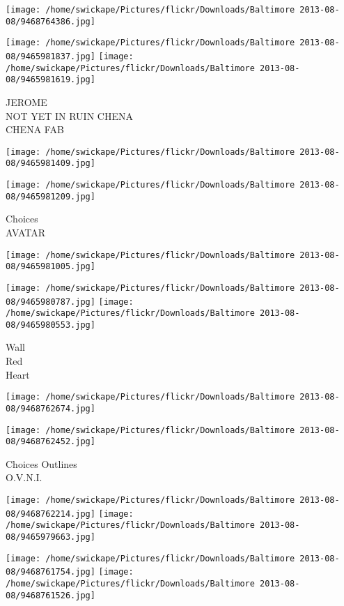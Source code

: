\documentclass[10pt,letterpaper]{article}
\begin{document}
\texttt{[image: /home/swickape/Pictures/flickr/Downloads/Baltimore 2013-08-08/9468764386.jpg]}

\vspace{0.25in}
\texttt{[image: /home/swickape/Pictures/flickr/Downloads/Baltimore 2013-08-08/9465981837.jpg]}
\texttt{[image: /home/swickape/Pictures/flickr/Downloads/Baltimore 2013-08-08/9465981619.jpg]}

JEROME\\
NOT YET IN RUIN CHENA\\
CHENA FAB
\pagebreak

\texttt{[image: /home/swickape/Pictures/flickr/Downloads/Baltimore 2013-08-08/9465981409.jpg]}

\vspace{0.25in}
\texttt{[image: /home/swickape/Pictures/flickr/Downloads/Baltimore 2013-08-08/9465981209.jpg]}

Choices\\
AVATAR
\pagebreak

\texttt{[image: /home/swickape/Pictures/flickr/Downloads/Baltimore 2013-08-08/9465981005.jpg]}

\vspace{0.25in}
\texttt{[image: /home/swickape/Pictures/flickr/Downloads/Baltimore 2013-08-08/9465980787.jpg]}
\texttt{[image: /home/swickape/Pictures/flickr/Downloads/Baltimore 2013-08-08/9465980553.jpg]}

Wall\\
Red\\
Heart
\pagebreak

\texttt{[image: /home/swickape/Pictures/flickr/Downloads/Baltimore 2013-08-08/9468762674.jpg]}

\vspace{0.25in}
\texttt{[image: /home/swickape/Pictures/flickr/Downloads/Baltimore 2013-08-08/9468762452.jpg]}

Choices Outlines\\
O.V.N.I.
\pagebreak

\texttt{[image: /home/swickape/Pictures/flickr/Downloads/Baltimore 2013-08-08/9468762214.jpg]}
\texttt{[image: /home/swickape/Pictures/flickr/Downloads/Baltimore 2013-08-08/9465979663.jpg]}

\texttt{[image: /home/swickape/Pictures/flickr/Downloads/Baltimore 2013-08-08/9468761754.jpg]}
\texttt{[image: /home/swickape/Pictures/flickr/Downloads/Baltimore 2013-08-08/9468761526.jpg]}
\end{document}
